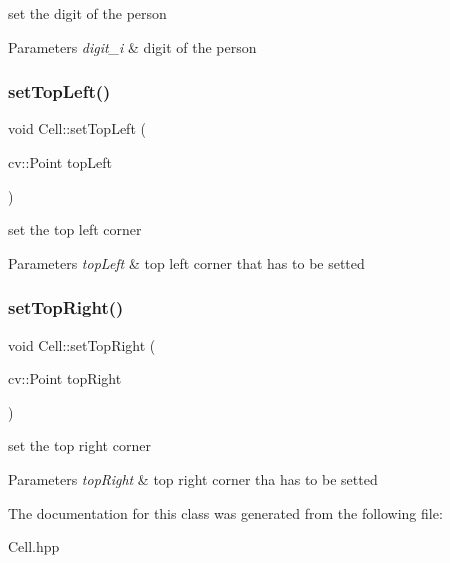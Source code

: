 set the digit of the person 
\begin{DoxyParams}{Parameters}
{\em digit\+\_\+i} & digit of the person \\
\hline
\end{DoxyParams}
\mbox{\label{class_cell_a9e2d13652a170ef25265a41dfe39e93f}} 
\subsubsection{\texorpdfstring{set\+Top\+Left()}{setTopLeft()}}
{\footnotesize\ttfamily void Cell\+::set\+Top\+Left (\begin{DoxyParamCaption}\item[{cv\+::\+Point}]{top\+Left }\end{DoxyParamCaption})}

set the top left corner 
\begin{DoxyParams}{Parameters}
{\em top\+Left} & top left corner that has to be setted \\
\hline
\end{DoxyParams}
\mbox{\label{class_cell_a245afe36e263e2fbf66880e4ea628f40}} 
\subsubsection{\texorpdfstring{set\+Top\+Right()}{setTopRight()}}
{\footnotesize\ttfamily void Cell\+::set\+Top\+Right (\begin{DoxyParamCaption}\item[{cv\+::\+Point}]{top\+Right }\end{DoxyParamCaption})}

set the top right corner 
\begin{DoxyParams}{Parameters}
{\em top\+Right} & top right corner tha has to be setted \\
\hline
\end{DoxyParams}


The documentation for this class was generated from the following file\+:\begin{DoxyCompactItemize}
\item 
Cell.\+hpp\end{DoxyCompactItemize}

